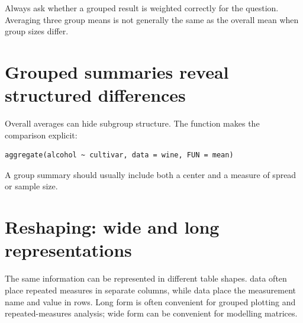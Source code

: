 \begin{keyidea}
Always ask whether a grouped result is weighted correctly for the question. Averaging three group means is not generally the same as the overall mean when group sizes differ.
\end{keyidea}

\section{Grouped summaries reveal structured differences}
Overall averages can hide subgroup structure. The  function makes the comparison explicit:
\begin{lstlisting}[style=dsr]
aggregate(alcohol ~ cultivar, data = wine, FUN = mean)
\end{lstlisting}
A group summary should usually include both a center and a measure of spread or sample size.


\section{Reshaping: wide and long representations}
The same information can be represented in different table shapes.  data often place repeated measures in separate columns, while  data place the measurement name and value in rows. Long form is often convenient for grouped plotting and repeated-measures analysis; wide form can be convenient for modelling matrices.

